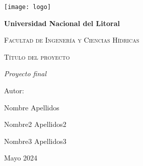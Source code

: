 \documentclass{report}
\begin{document}
\begin{titlepage}
\centering
{\texttt{[image: logo]}\par}
\vspace{1cm}
{\bfseries\LARGE Universidad Nacional del Litoral\par}
\vspace{1cm}
{\scshape\Large Facultad de Ingenería y Ciencias Hídricas \par}
\vspace{3cm}
{\scshape\Huge Título del proyecto \par}
\vspace{3cm}
{\itshape\Large Proyecto final \par}
\vfill
{\Large Autor: \par}
{\Large Nombre Apellidos \par}
{\Large Nombre2 Apellidos2 \par}
{\Large Nombre3 Apellidos3 \par}
\vfill
{\Large Mayo 2024 \par}
\end{titlepage}
\end{document}

